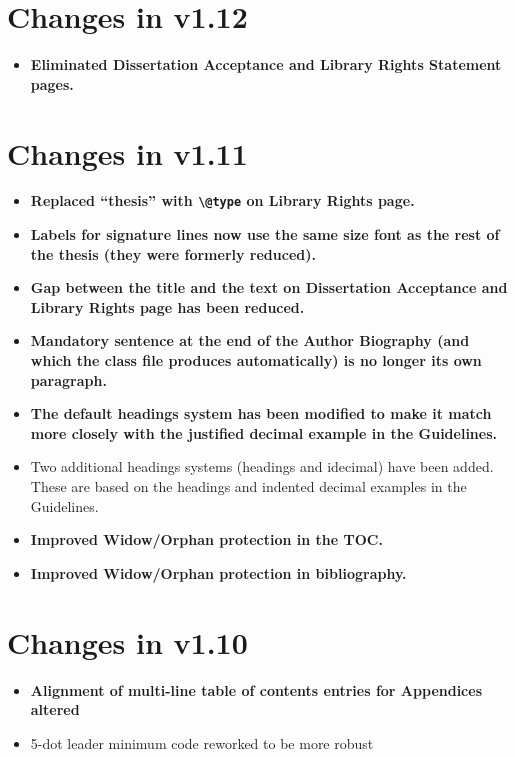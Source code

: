 \section{Changes in v1.12}
\begin{itemize}
\item{\bfseries Eliminated Dissertation Acceptance and Library Rights Statement pages.}
\end{itemize}

\section{Changes in v1.11}
\begin{itemize}
\item{\bfseries Replaced ``thesis'' with \verb=\@type= on Library Rights page.}
\item{\textbf{Labels for signature lines now use the same size font as the rest of the thesis (they were formerly reduced).}}
\item{\textbf{Gap between the title and the text on Dissertation Acceptance and Library Rights page has been reduced.}}
\item{\textbf{Mandatory sentence at the end of the Author Biography (and which the class file produces automatically) is no longer its own paragraph.}}
\item{\textbf{The default headings system has been modified to make it match more closely with the justified decimal example in the Guidelines.}}
\item{Two additional headings systems (headings and idecimal) have been added.  These are based on the headings and indented decimal examples in the Guidelines.}
\item{\bfseries Improved Widow/Orphan protection in the TOC.}
\item{\bfseries Improved Widow/Orphan protection in bibliography.}
\end{itemize}

\section{Changes in v1.10}
\begin{itemize}
\item{\textbf{Alignment of multi-line table of contents entries for Appendices altered}}
\item{5-dot leader minimum code reworked to be more robust}
\end{itemize}


